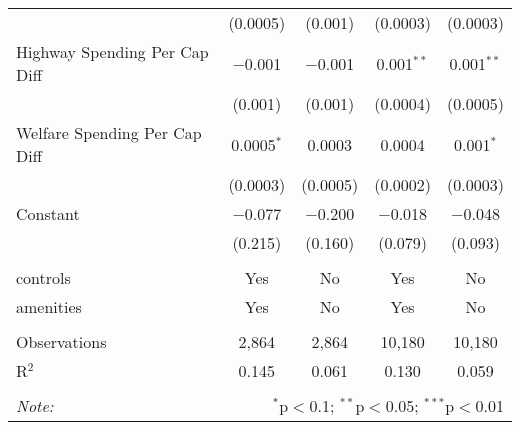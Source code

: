 \begin{table}[!htbp]
\begin{tabular}{@{\extracolsep{5pt}}lcccc}
  & (0.0005) & (0.001) & (0.0003) & (0.0003) \\ 
  Highway Spending Per Cap Diff & $-$0.001 & $-$0.001 & 0.001$^{**}$ & 0.001$^{**}$ \\ 
  & (0.001) & (0.001) & (0.0004) & (0.0005) \\ 
  Welfare Spending Per Cap Diff & 0.0005$^{*}$ & 0.0003 & 0.0004 & 0.001$^{*}$ \\ 
  & (0.0003) & (0.0005) & (0.0002) & (0.0003) \\ 
  Constant & $-$0.077 & $-$0.200 & $-$0.018 & $-$0.048 \\ 
  & (0.215) & (0.160) & (0.079) & (0.093) \\ 
 \hline \\[-1.8ex] 
controls & Yes & No & Yes & No \\ 
amenities & Yes & No & Yes & No \\ 
\hline \\[-1.8ex] 
Observations & 2,864 & 2,864 & 10,180 & 10,180 \\ 
R$^{2}$ & 0.145 & 0.061 & 0.130 & 0.059 \\ 
\hline 
\hline \\[-1.8ex] 
\textit{Note:}  & \multicolumn{4}{r}{$^{*}$p$<$0.1; $^{**}$p$<$0.05; $^{***}$p$<$0.01} \\ 
\end{tabular} 
\end{table} 
